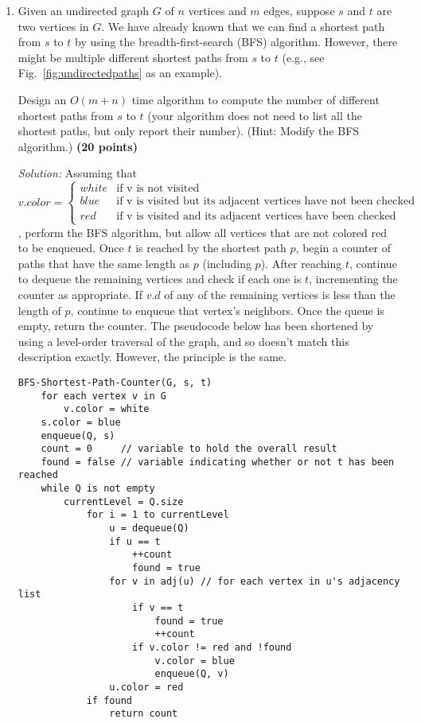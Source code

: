 \documentclass[11pt]{article}
\begin{document}
\begin{enumerate}
\begin{enumerate}
{\hfill \bf (10 points)}

{\bf Remark:} According to the above statement, we can determine whether $G$ is strongly connected in $O(m+n)$ time by using your algorithms for the above two questions (a) and (b).

\end{enumerate}


\item
Given an undirected graph $G$ of $n$ vertices and $m$ edges, suppose $s$ and $t$ are two vertices in $G$. We have already known that we can find a shortest path from $s$ to $t$ by using the breadth-first-search (BFS) algorithm. However, there might be multiple different shortest paths from $s$ to $t$ (e.g., see Fig.~\ref{fig:undirectedpaths} as an example).

Design an $O(m+n)$ time algorithm to compute the number of different shortest paths from $s$ to $t$ (your algorithm does not need to list all the shortest paths, but only report their number). (Hint: Modify the BFS algorithm.)
{\hfill \bf (20 points)}

\textit{Solution:} Assuming that
\[v.color = 
\begin{cases} 
white & \mbox{if v is not visited} \\ 
blue & \mbox{if v is visited but its adjacent vertices have not been checked} \\
red & \mbox{if v is visited and its adjacent vertices have been checked}
\end{cases}\],
perform the BFS algorithm, but allow all vertices that are not colored red to be enqueued. Once $t$ is reached by the shortest path $p$, begin a counter of paths that have the same length as $p$ (including $p$). After reaching $t$, continue to dequeue the remaining vertices and check if each one is $t$, incrementing the counter as appropriate. If $v.d$ of any of the remaining vertices is less than the length of $p$, continue to enqueue that vertex's neighbors. Once the queue is empty, return the counter.
The pseudocode below has been shortened by using a level-order traversal of the graph, and so doesn't match this description exactly. However, the principle is the same.
\newpage
\begin{verbatim}
BFS-Shortest-Path-Counter(G, s, t)
    for each vertex v in G
        v.color = white
    s.color = blue
    enqueue(Q, s)
    count = 0     // variable to hold the overall result
    found = false // variable indicating whether or not t has been reached
    while Q is not empty
        currentLevel = Q.size
            for i = 1 to currentLevel
                u = dequeue(Q)
                if u == t
                    ++count
                    found = true
                for v in adj(u) // for each vertex in u's adjacency list
                    if v == t
                        found = true
                        ++count
                    if v.color != red and !found
                        v.color = blue
                        enqueue(Q, v)
                u.color = red
            if found
                return count
\end{verbatim}


\end{enumerate}
\end{document}
